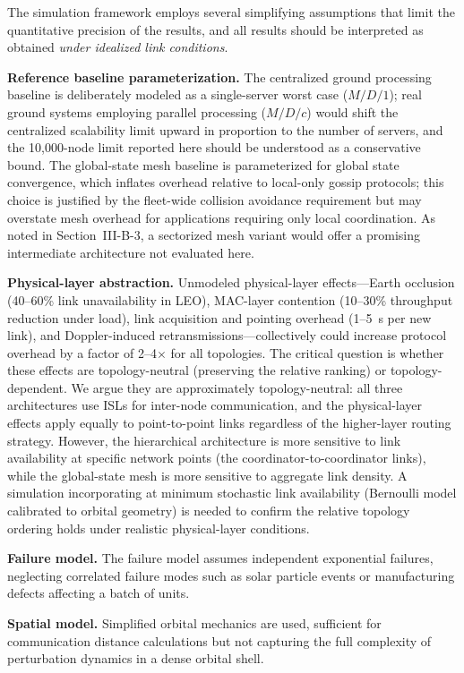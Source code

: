 \documentclass[journal]{IEEEtran}
\begin{document}
The simulation framework employs several simplifying assumptions that limit the quantitative precision of the results, and all results should be interpreted as obtained \emph{under idealized link conditions}.

\textbf{Reference baseline parameterization.} The centralized ground processing baseline is deliberately modeled as a single-server worst case ($M/D/1$); real ground systems employing parallel processing ($M/D/c$) would shift the centralized scalability limit upward in proportion to the number of servers, and the 10{,}000-node limit reported here should be understood as a conservative bound. The global-state mesh baseline is parameterized for global state convergence, which inflates overhead relative to local-only gossip protocols; this choice is justified by the fleet-wide collision avoidance requirement but may overstate mesh overhead for applications requiring only local coordination. As noted in Section~III-B-3, a sectorized mesh variant would offer a promising intermediate architecture not evaluated here.

\textbf{Physical-layer abstraction.} Unmodeled physical-layer effects---Earth occlusion (40--60\% link unavailability in LEO), MAC-layer contention (10--30\% throughput reduction under load), link acquisition and pointing overhead (1--5~s per new link), and Doppler-induced retransmissions---collectively could increase protocol overhead by a factor of 2--4$\times$ for all topologies. The critical question is whether these effects are topology-neutral (preserving the relative ranking) or topology-dependent. We argue they are approximately topology-neutral: all three architectures use ISLs for inter-node communication, and the physical-layer effects apply equally to point-to-point links regardless of the higher-layer routing strategy. However, the hierarchical architecture is more sensitive to link availability at specific network points (the coordinator-to-coordinator links), while the global-state mesh is more sensitive to aggregate link density. A simulation incorporating at minimum stochastic link availability (Bernoulli model calibrated to orbital geometry) is needed to confirm the relative topology ordering holds under realistic physical-layer conditions.

\textbf{Failure model.} The failure model assumes independent exponential failures, neglecting correlated failure modes such as solar particle events or manufacturing defects affecting a batch of units.

\textbf{Spatial model.} Simplified orbital mechanics are used, sufficient for communication distance calculations but not capturing the full complexity of perturbation dynamics in a dense orbital shell.
\end{document}
